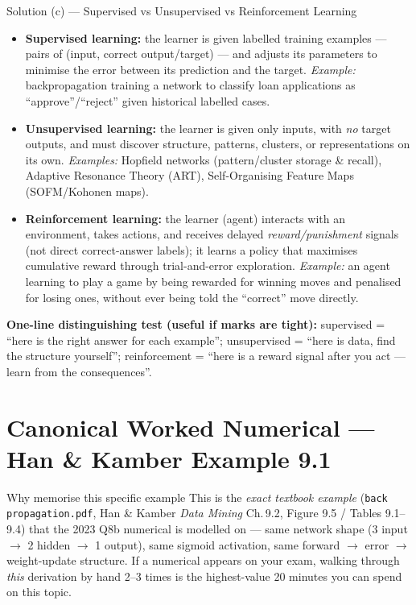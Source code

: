\documentclass[12pt,a4paper]{article}
\begin{document}
\begin{solbox}{Solution (c) --- Supervised vs Unsupervised vs Reinforcement Learning}
\begin{itemize}[noitemsep]
  \item \textbf{Supervised learning:} the learner is given labelled training examples --- pairs of (input, correct output/target) --- and adjusts its parameters to minimise the error between its prediction and the target. \emph{Example:} backpropagation training a network to classify loan applications as ``approve''/``reject'' given historical labelled cases.
  \item \textbf{Unsupervised learning:} the learner is given only inputs, with \emph{no} target outputs, and must discover structure, patterns, clusters, or representations on its own. \emph{Examples:} Hopfield networks (pattern/cluster storage \& recall), Adaptive Resonance Theory (ART), Self-Organising Feature Maps (SOFM/Kohonen maps).
  \item \textbf{Reinforcement learning:} the learner (agent) interacts with an environment, takes actions, and receives delayed \emph{reward/punishment} signals (not direct correct-answer labels); it learns a policy that maximises cumulative reward through trial-and-error exploration. \emph{Example:} an agent learning to play a game by being rewarded for winning moves and penalised for losing ones, without ever being told the ``correct'' move directly.
\end{itemize}
\textbf{One-line distinguishing test (useful if marks are tight):} supervised = ``here is the right answer for each example''; unsupervised = ``here is data, find the structure yourself''; reinforcement = ``here is a reward signal after you act --- learn from the consequences''.
\end{solbox}

\newpage
\section*{Canonical Worked Numerical --- Han \& Kamber Example 9.1}

\begin{keybox}{Why memorise this specific example}
This is the \emph{exact textbook example} (\texttt{back propagation.pdf}, Han \& Kamber \emph{Data Mining} Ch.\,9.2, Figure 9.5 / Tables 9.1--9.4) that the 2023 Q8b numerical is modelled on --- same network shape (3 input $\to$ 2 hidden $\to$ 1 output), same sigmoid activation, same forward $\to$ error $\to$ weight-update structure. If a numerical appears on your exam, walking through \emph{this} derivation by hand 2--3 times is the highest-value 20 minutes you can spend on this topic.
\end{keybox}
\end{document}

